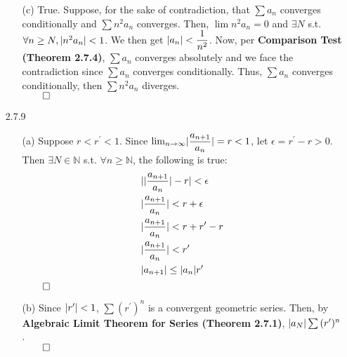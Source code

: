 \documentclass[11pt]{article}
\DeclarePairedDelimiter\abs{\lvert}{\rvert}%
\newcommand{\nats}{\mathbb{N}}
\begin{document}
\begin{itemize}
\begin{itemize}
            \item[(c)]
                True. Suppose, for the sake of contradiction, that $\sum{a_n}$
                converges conditionally and $\sum{n^2a_n}$ converges. Then,
                $\lim{n^2a_n} = 0$ and $\exists N$ s.t. $\forall n \geq N,
                \abs{n^2a_n} < 1$. We then get $\abs{a_n} < \dfrac{1}{n^2}$.
                Now, per \textbf{Comparison Test (Theorem 2.7.4)}, $\sum{a_n}$
                converges absolutely and we face the contradiction since
                $\sum{a_n}$ converges conditionally. Thus, $\sum{a_n}$
                converges conditionally, then $\sum{n^2a_n}$ diverges.\\
                $\qed$
        \end{itemize}

    \item[2.7.9]
        \begin{itemize}
            \item[(a)]
                Suppose $r < r^\prime < 1$. Since $\lim_{n \to
                \infty}\abs{\dfrac{a_{n + 1}}{a_n}} = r < 1$, let $\epsilon =
                r^\prime - r > 0$. Then $\exists N \in \nats$ s.t. $\forall n
                \geq \nats$, the following is true:
                \begin{align*}
                    &\abs{\abs{\dfrac{a_{n + 1}}{a_n}} - r} < \epsilon\\
                    &\abs{\dfrac{a_{n + 1}}{a_n}} < r + \epsilon\\
                    &\abs{\dfrac{a_{n + 1}}{a_n}} < r + r^\prime - r\\
                    &\abs{\dfrac{a_{n + 1}}{a_n}} < r^\prime\\
                    &\abs{a_{n + 1}} \leq \abs{{a_n}}r^\prime
                \end{align*}
                $\qed$

            \item[(b)]
                Since $\abs{r^\prime} < 1$, $\sum(r^\prime)^n$ is a convergent
                geometric series. Then, by \textbf{Algebraic Limit Theorem for
                Series (Theorem 2.7.1)}, $\abs{a_N}\sum{(r^\prime)^n}$.\\
                $\qed$


\end{itemize}
\end{itemize}
\end{document}

